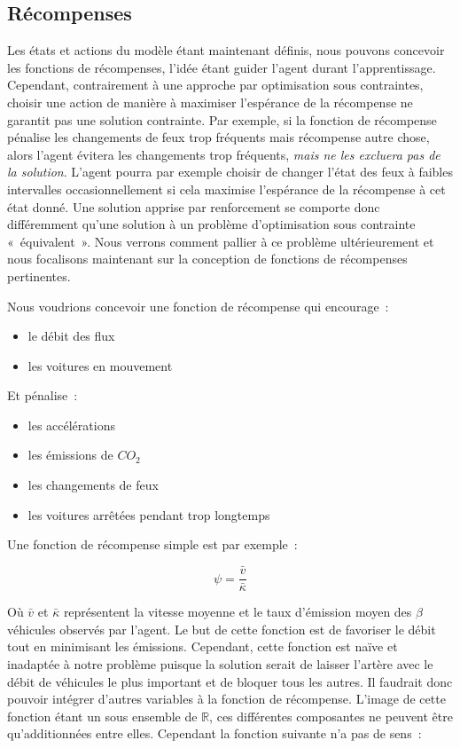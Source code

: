 \documentclass[11pt]{article}
\begin{document}
\subsection{Récompenses}
\label{sec:orgfa6677c}

Les états et actions du modèle étant maintenant définis, nous pouvons concevoir les fonctions de récompenses, l'idée étant guider l'agent durant l'apprentissage. Cependant, contrairement à une approche par optimisation sous contraintes, choisir une action de manière à maximiser l'espérance de la récompense ne garantit pas une solution contrainte. Par exemple, si la fonction de récompense pénalise les changements de feux trop fréquents mais récompense autre chose, alors l'agent évitera les changements trop fréquents, \emph{mais ne les excluera pas de la solution}. L'agent pourra par exemple choisir de changer l'état des feux à faibles intervalles occasionnellement si cela maximise l'espérance de la récompense à cet état donné. Une solution apprise par renforcement se comporte donc différemment qu'une solution à un problème d'optimisation sous contrainte « équivalent ». Nous verrons comment pallier à ce problème ultérieurement et nous focalisons maintenant sur la conception de fonctions de récompenses pertinentes.

Nous voudrions concevoir une fonction de récompense qui encourage :

\begin{itemize}
\item le débit des flux
\item les voitures en mouvement
\end{itemize}

Et pénalise :

\begin{itemize}
\item les accélérations
\item les émissions de \(CO_2\)
\item les changements de feux
\item les voitures arrêtées pendant trop longtemps
\end{itemize}

Une fonction de récompense simple est par exemple :

$$\psi = \frac{\bar{v}}{\bar{\kappa}}$$

Où \(\bar{v}\) et \(\bar{\kappa}\) représentent la vitesse moyenne et le taux d'émission moyen des \(\beta\) véhicules observés par l'agent. Le but de cette fonction est de favoriser le débit tout en minimisant les émissions. Cependant, cette fonction est naïve et inadaptée à notre problème puisque la solution serait de laisser l'artère avec le débit de véhicules le plus important et de bloquer tous les autres. Il faudrait donc pouvoir intégrer d'autres variables à la fonction de récompense. L'image de cette fonction étant un sous ensemble de \(\mathbb{R}\), ces différentes composantes ne peuvent être qu'additionnées entre elles. Cependant la fonction suivante n'a pas de sens :
\end{document}
